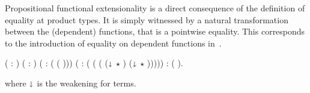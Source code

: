 

  Propositional functional extensionality is a direct consequence of the definition
  of equality at product types. It is simply witnessed by a natural transformation
  between the (dependent) functions, that is a pointwise equality. This corresponds 
  to the introduction of equality on dependent functions in~\cite{DBLP:conf/popl/LicataH12}.


\begin{coqdoccode}
\coqdocemptyline
\coqdocnoindent
{}   ( :  )
        ( :  ) (  :  ( (\coqdocvar{$\Lambda$} ))) \coqdoceol
        ( :  ( (\coqdocvar{$\Lambda$} ( ($\shortdownarrow$ $\star$  ) ($\shortdownarrow$ $\star$  )))))
  :  (  ).
\coqdocemptyline
\end{coqdoccode}


  \noindent where $\shortdownarrow$ is the weakening for terms. 
